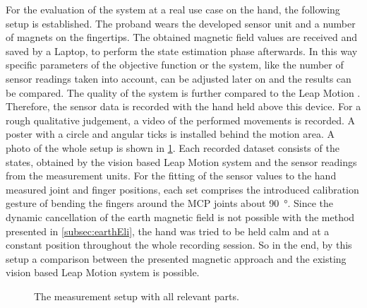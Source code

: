 For the evaluation of the system at a real use case on the hand, the following setup is established. The proband wears the developed sensor unit and a number of magnets on the fingertips. The obtained magnetic field values are received and saved by a Laptop, to perform the state estimation phase afterwards. In this way specific parameters of the objective function or the system, like the number of sensor readings taken into account, can be adjusted later on and the results can be compared. The quality of the system is further compared to the Leap Motion \cite{leap}. Therefore, the sensor data is recorded with the hand held above this device. For a rough qualitative judgement, a video of the performed movements is recorded. A poster with a circle and angular ticks is installed behind the motion area. A photo of the whole setup is shown in \ref{fig:setup}. Each recorded dataset consists of the states, obtained by the vision based Leap Motion system and the sensor readings from the measurement units. For the fitting of the sensor values to the hand measured joint and finger positions, each set comprises the introduced calibration gesture of bending the fingers around the \ac{MCP} joints about \SI{90}{\degree}. Since the dynamic cancellation of the earth magnetic field is not possible with the method presented in \ref{subsec:earthEli}, the hand was tried to be held calm and at a constant position throughout the whole recording session. So in the end, by this setup a comparison between the presented magnetic approach and the existing vision based Leap Motion system is possible.
\begin{figure}[!htb]
\centering
{}
\caption[Measurement setup]
{The measurement setup with all relevant parts.}
\label{fig:setup}
\end{figure}


